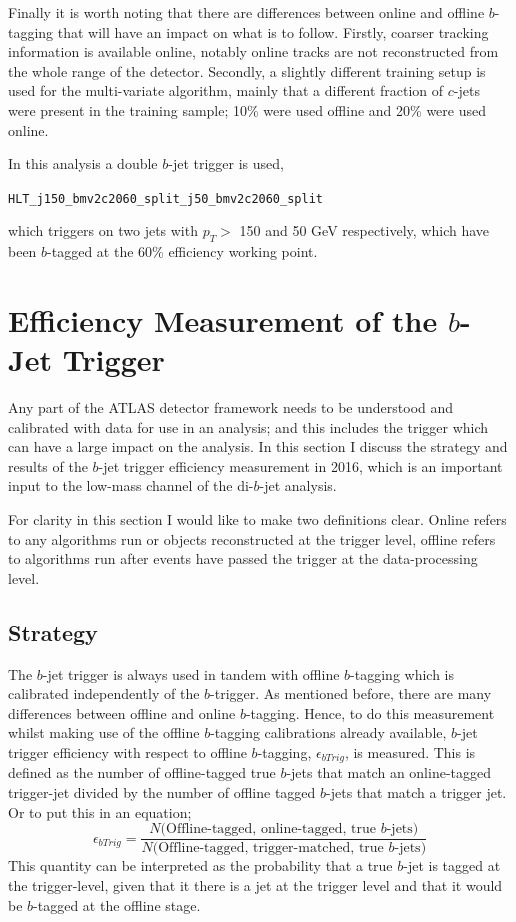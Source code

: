 Finally it is worth noting that there are  differences between online and offline $b$-tagging that will have an impact on what is to follow.
Firstly, coarser tracking information is available online, notably online tracks are not reconstructed from the whole range of the detector.
Secondly, a slightly different training setup is used for the multi-variate algorithm, mainly that a different fraction of $c$-jets were present in the training sample;
10\% were used offline and 20\% were used online.

In this analysis a double $b$-jet trigger is used,
\begin{center}
\verb|HLT_j150_bmv2c2060_split_j50_bmv2c2060_split|
\end{center}
which triggers on two jets with $p_T >$ 150 and 50 GeV respectively,
which have been $b$-tagged at the 60\% efficiency working point.

\newpage

\section{Efficiency Measurement of the $b$-Jet Trigger}
\label{sec:trig-bjet_eff}

Any part of the ATLAS detector framework needs to be understood and calibrated with data for use in an analysis;
and this includes the trigger which can have a large impact on the analysis.
In this section I discuss the strategy and results of the $b$-jet trigger efficiency measurement in 2016,
which is an important input to the low-mass channel of the di-$b$-jet analysis.

For clarity in this section I would like to make two definitions clear.
Online refers to any algorithms run or objects reconstructed at the trigger level,
offline refers to algorithms run after events have passed the trigger at the data-processing level. 

\subsection{Strategy}
The $b$-jet trigger is always used in tandem with offline $b$-tagging which is calibrated independently of the $b$-trigger.
As mentioned before, there are many differences between offline and online $b$-tagging.
Hence, to do this measurement whilst making use of the offline $b$-tagging calibrations already available,
$b$-jet trigger efficiency with respect to offline $b$-tagging, $\epsilon_{bTrig}$, is measured.
This is defined as the number of offline-tagged true $b$-jets that match an online-tagged trigger-jet
divided by the number of offline tagged $b$-jets that match a trigger jet.
Or to put this in an equation;
\begin{equation}
 \epsilon_{bTrig} = \frac{N(\text{Offline-tagged, online-tagged, true $b$-jets)}}{N(\text{Offline-tagged, trigger-matched, true $b$-jets)}}
\end{equation}
This quantity can be interpreted as the probability that a true $b$-jet is tagged at the trigger-level,
given that it there is a jet at the trigger level and that it would be $b$-tagged at the offline stage.

